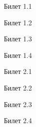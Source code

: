 \documentclass[a4paper,12pt]{article}
\begin{document}
\newpage
\begin{mybox}{\hypertarget{bil1_1}{Билет 1.1}}
\end{mybox}
\newpage
\begin{mybox2}{\hypertarget{bil1_2}{Билет 1.2}}
\end{mybox2}
\newpage
\begin{mybox}{\hypertarget{bil1_3}{Билет 1.3}}
\end{mybox}
\newpage
\begin{mybox2}{\hypertarget{bil1_4}{Билет 1.4}}
\end{mybox2}

\newpage
\begin{mybox}{\hypertarget{bil2_1}{Билет 2.1}}
\end{mybox}
\newpage
\begin{mybox2}{\hypertarget{bil2_2}{Билет 2.2}}
\end{mybox2}
\newpage
\begin{mybox}{\hypertarget{bil2_3}{Билет 2.3}}
\end{mybox}
\newpage
\begin{mybox2}{\hypertarget{bil2_4}{Билет 2.4}}
\end{mybox2}
\end{document}
